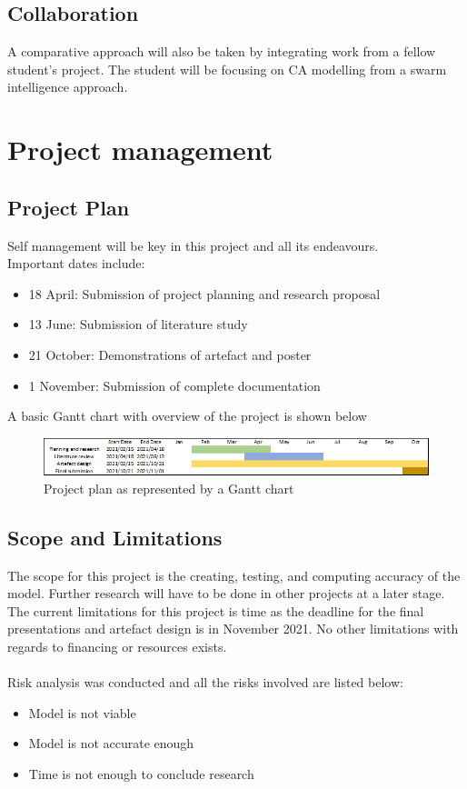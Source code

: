 \subsection{Collaboration}
A comparative approach will also be taken by integrating work from a fellow student's project. The student will be focusing on CA modelling from a swarm intelligence approach.
\section{Project management}
\subsection{Project Plan}
Self management will be key in this project and all its endeavours.\\
Important dates include:
\begin{itemize}
\item 18 April: Submission of project planning and research proposal
\item 13 June: Submission of literature study          
\item 21 October: Demonstrations of artefact and poster          
\item 1 November: Submission of complete documentation 
\end{itemize}
A basic Gantt chart with overview of the project is shown below
\begin{figure}[H]
\centering
\includegraphics[scale=0.8]{Figures/Chapter1/Chart.png}
\caption{Project plan as represented by a Gantt chart}
\label{fig:fig1}
\end{figure}
\subsection{Scope and Limitations}
The scope for this project is the creating, testing, and computing accuracy of the model. Further research will have to be done in other projects at a later stage. The current limitations for this project is time as the deadline for the final presentations and artefact design is in November 2021. No other limitations with regards to financing or resources exists.\\\\
Risk analysis was conducted and all the risks involved are listed below:
\begin{itemize}
\item Model is not viable
\item Model is not accurate enough
\item Time is not enough to conclude research
\end{itemize}
